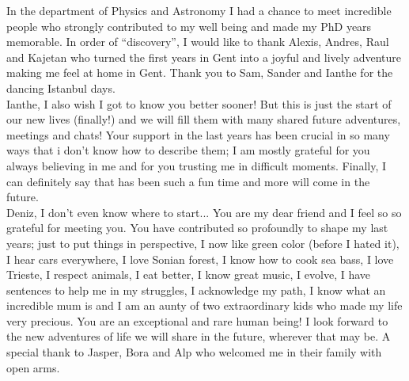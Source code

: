 \begin{acknowledgements}
{In the department of Physics and Astronomy I had a chance to meet incredible people who strongly contributed to my well being and made my PhD years memorable.  In order of ``discovery'', I would like to thank Alexis, Andres, Raul and Kajetan who turned the first years in Gent into a joyful and lively adventure making me feel at home in Gent. Thank you to Sam, Sander and Ianthe for the dancing Istanbul days. \\
Ianthe, I also wish I got to know you better sooner! But this is just the start of our new lives (finally!) and we will fill them with many shared future adventures, meetings and chats! Your support in the last years has been crucial in so many ways that i don't know how to describe them; I am mostly grateful for you always believing in me and for you trusting me in difficult moments. Finally, I can definitely say that has been such a fun time and more will come in the future. \\
Deniz, I don't even know where to start... You are my dear friend and I feel so so grateful for meeting you. You have contributed so profoundly to shape my last years; just to put things in perspective, I now like green color (before I hated it), I hear cars everywhere, I love Sonian forest, I know how to cook sea bass, I love Trieste, I respect animals, I eat better, I know great music, I evolve, I have sentences to help me in my struggles, I acknowledge my path, I know what an incredible mum is and I am an aunty of two extraordinary kids who made my life very precious. You are an exceptional and rare human being! I look forward to the new adventures of life we will share in the future, wherever that may be. A special thank to Jasper, Bora and Alp who welcomed me in their family with open arms.\\

}
\end{acknowledgements}

